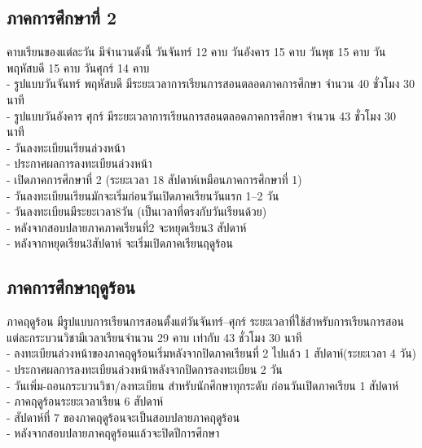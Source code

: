   \subsection{ภาคการศึกษาที่ 2}
  คาบเรียนของแต่ละวัน มีจำนวนดังนี้ วันจันทร์ 12 คาบ วันอังคาร 15 คาบ วันพุธ 15 คาบ วันพฤหัสบดี 15 คาบ วันศุกร์ 14 คาบ \\
  - รูปแบบวันจันทร์ พฤหัสบดี มีระยะเวลาการเรียนการสอนตลอดภาคการศึกษา จำนวน 40 ชั่วโมง 30 นาที \\
  - รูปแบบวันอังคาร ศุกร์ มีระยะเวลาการเรียนการสอนตลอดภาคการศึกษา จำนวน 43 ชั่วโมง 30 นาที \\
  - วันลงทะเบียนเรียนล่วงหน้า  \\
  - ประกาศผลการลงทะเบียนล่วงหน้า  \\
  - เปิดภาคการศึกษาที่ 2 (ระยะเวลา 18 สัปดาห์เหมือนภาคการศึกษาที่ 1) \\
  - วันลงทะเบียนเรียนมักจะเริ่มก่อนวันเปิดภาคเรียนวันแรก 1--2 วัน \\
  - วันลงทะเบียนมีระยะเวลา8วัน (เป็นเวลาที่ตรงกับวันเรียนด้วย) \\
  - หลังจากสอบปลายภาคภาคเรียนที่2 จะหยุดเรียน3 สัปดาห์ \\
  - หลังจากหยุดเรียน3สัปดาห์ จะเริ่มเปิดภาคเรียนฤดูร้อน

  \subsection{ภาคการศึกษาฤดูร้อน}
  ภาคฤดูร้อน มีรูปแบบการเรียนการสอนตั้งแต่วันจันทร์--ศุกร์ ระยะเวลาที่ใช้สำหรับการเรียนการสอนแต่ละกระบวนวิชามีเวลาเรียนจำนวน 29 คาบ เท่ากับ 43 ชั่วโมง 30 นาที \\
  - ลงทะเบียนล่วงหน้าของภาคฤดูร้อนเริ่มหลังจากปิดภาคเรียนที่ 2 ไปแล้ว 1 สัปดาห์(ระยะเวลา 4 วัน) \\
  - ประกาศผลการลงทะเบียนล่วงหน้าหลังจากปิดการลงทะเบียน 2 วัน \\
  - วันเพิ่ม-ถอนกระบวนวิชา/ลงทะเบียน สำหรับนักศึกษาทุกระดับ ก่อนวันเปิดภาคเรียน 1 สัปดาห์ \\
  - ภาคฤดูร้อนระยะเวลาเรียน 6 สัปดาห์ \\
  - สัปดาห์ที่ 7 ของภาคฤดูร้อนจะเป็นสอบปลายภาคฤดูร้อน \\
  - หลังจากสอบปลายภาคฤดูร้อนแล้วจะปิดปีการศึกษา \\
   \\


